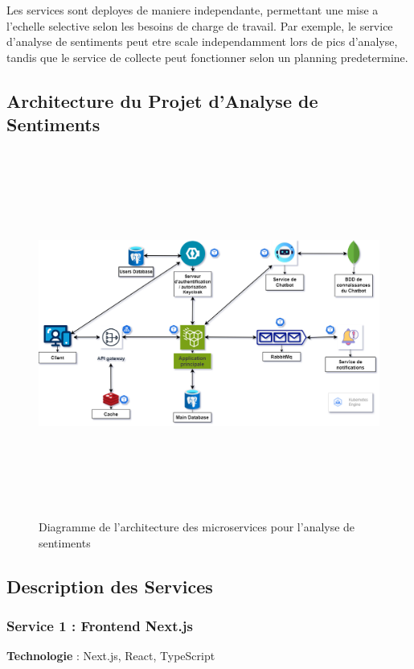 Les services sont deployes de maniere independante, permettant une mise a l'echelle selective selon les besoins de charge de travail. Par exemple, le service d'analyse de sentiments peut etre scale independamment lors de pics d'analyse, tandis que le service de collecte peut fonctionner selon un planning predetermine.

\subsection{Architecture du Projet d'Analyse de Sentiments}

\begin{figure}[H]
\centering
\includegraphics[height=12cm , width=\textwidth]{assets/images/architecture.png}
\caption{Diagramme de l'architecture des microservices pour l'analyse de sentiments}
\label{fig:architecture-microservices}
\end{figure}

\subsection{Description des Services}

\subsubsection{Service 1 : Frontend Next.js}

\textbf{Technologie} : Next.js, React, TypeScript

